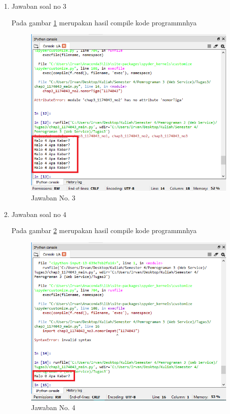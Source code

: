 \begin{enumerate}
			
			
			\item Jawaban soal no 3
				

				\subitem Pada gambar \ref{gambar3} merupakan hasil compile kode programmnhya				

				\begin{figure} [ht]
					\centerline{\includegraphics[width=1\textwidth]{figures/chapter3/3_1174043.png}}
					\caption{Jawaban No. 3}
					\label{gambar3}
				\end{figure}

			
				
			\item Jawaban soal no 4
				

				\subitem Pada gambar \ref{gambar4} merupakan hasil compile kode programmnhya								

				\begin{figure} [ht]
					\centerline{\includegraphics[width=1\textwidth]{figures/chapter3/4_1174043.png}}
					\caption{Jawaban No. 4}
					\label{gambar4}
				\end{figure}


\end{enumerate}
